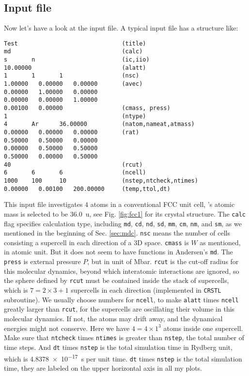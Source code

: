 
\subsection{Input file}

Now let's have a look at the input file.
A typical input file has a structure like:
\begin{verbatim}
Test                              (title)
md                                (calc)
s       n                         (ic,iio)
10.00000                          (alatt)
1       1       1                 (nsc)
1.00000   0.00000   0.00000       (avec)
0.00000   1.00000   0.00000
0.00000   0.00000   1.00000
0.00100   0.00000                 (cmass, press)
1                                 (ntype)
4       Ar      36.00000          (natom,nameat,atmass)
0.00000   0.00000   0.00000       (rat)
0.50000   0.50000   0.00000
0.00000   0.50000   0.50000
0.50000   0.00000   0.50000
40                                (rcut)
6       6       6                 (ncell)
1000    100     10                (nstep,ntcheck,ntimes)
0.00000   0.00100   200.00000     (temp,ttol,dt)
\end{verbatim}

This input file investigates $4$  atoms in a conventional FCC unit cell, 
's atomic mass is selected to be \SI{36.0}{\atomicmassunit},
see Fig. \ref{fig:fcc1} for its crystal structure.
The \texttt{calc} flag specifies calculation type, including \texttt{md},
\texttt{cd}, \texttt{nd}, \texttt{sd}, \texttt{mm}, \texttt{cm}, \texttt{nm}, and \texttt{sm}, as we mentioned in the beginning of Sec. \ref{sec:mdc}.
\texttt{nsc} means the number of cells consisting a supercell in each direction of a 3D space.
\texttt{cmass} is $W$ as mentioned, in atomic unit. But it does not seem to have functions in Andersen's \texttt{md}.
The \texttt{press} is external pressure $P$, but in unit of \si{\mega\bar}.
\texttt{rcut} is the cut-off radius for this molecular dynamics, beyond which interatomic interactions are ignored, so the sphere defined by
\texttt{rcut} must be contained inside the stack of supercells, which is $7=2\times 3+1$ supercells in each direction (implemented in \texttt{CRSTL} subroutine). We usually choose numbers for \texttt{ncell}, to make
\texttt{alatt} times \texttt{ncell} greatly larger than \texttt{rcut}, for the supercells are
oscillating their volume in this molecular dynamics.
If not, the atoms may drift away, and the dynamical energies might not conserve.
Here we have $4=4 \times 1^3$ atoms inside one supercell.
Make sure that \texttt{ntcheck} times \texttt{ntimes} is greater than
\texttt{nstep}, the total number of time steps.
And \texttt{dt} times \texttt{nstep} is the total simulation time in Rydberg unit, which is
\SI{4.8378e-17}{\second} per unit time. \texttt{dt} times \texttt{nstep} is the total simulation time,
they are labeled on the upper horizontal axis in all my plots.

